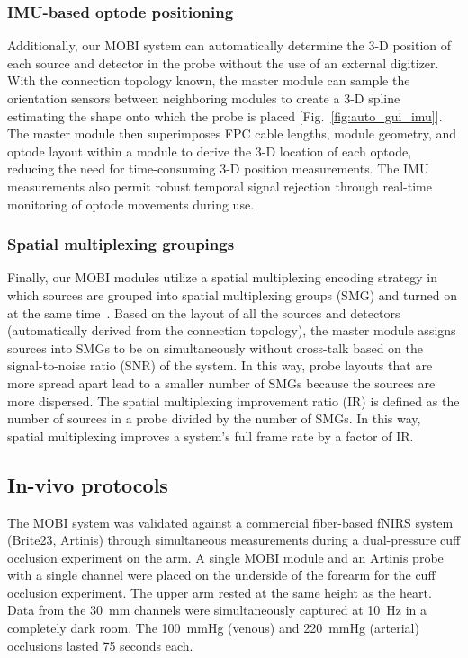 \subsubsection{IMU-based optode positioning}
Additionally, our \ac{MOBI} system can automatically determine the 3-D position of each source and detector in the probe without the use of an external digitizer. With the connection topology known, the master module can sample the orientation sensors between neighboring modules to create a 3-D spline estimating the shape onto which the probe is placed [Fig.~\ref{fig:auto_gui_imu}]. The master module then superimposes FPC cable lengths, module geometry, and optode layout within a module to derive the 3-D location of each optode, reducing the need for time-consuming 3-D position measurements. The IMU measurements also permit robust temporal signal rejection through real-time monitoring of optode movements during use. 

\subsubsection{Spatial multiplexing groupings}
Finally, our \ac{MOBI} modules utilize a spatial multiplexing encoding strategy in which sources are grouped into spatial multiplexing groups (SMG) and turned on at the same time~\cite{Vanegas2022}. Based on the layout of all the sources and detectors (automatically derived from the connection topology), the master module assigns sources into SMGs to be on simultaneously without cross-talk based on the signal-to-noise ratio (SNR) of the system. In this way, probe layouts that are more spread apart lead to a smaller number of SMGs because the sources are more dispersed. The spatial multiplexing improvement ratio (IR) is defined as the number of sources in a probe divided by the number of SMGs. In this way, spatial multiplexing improves a system's full frame rate by a factor of IR. 

\subsection{In-vivo protocols}
The \ac{MOBI} system was validated against a commercial fiber-based \ac{fNIRS} system (Brite23, Artinis) through simultaneous measurements during a dual-pressure cuff occlusion experiment on the arm. A single \ac{MOBI} module and an Artinis probe with a single channel were placed on the underside of the forearm for the cuff occlusion experiment. The upper arm rested at the same height as the heart. Data from the 30~mm channels were simultaneously captured at 10~Hz in a completely dark room. The 100~mmHg (venous) and 220~mmHg (arterial) occlusions lasted 75 seconds each. 


